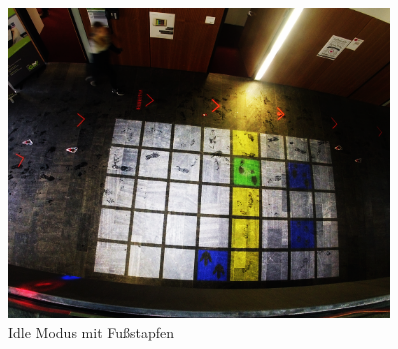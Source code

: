 \begin{figure}[htbp]
	\centering
		\includegraphics[width=0.9\textwidth]{images/IdleAni}
	\caption{Idle Modus mit Fußstapfen}
	\label{fig:IdleAni}
\end{figure}
